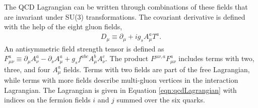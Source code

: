 The QCD Lagrangian can be written through combinations of these fields that are invariant under SU(3) transformations.
The covariant derivative is defined with the help of the eight gluon fields,
\begin{equation}\begin{split}
    D_\mu\equiv\partial_\mu+ig_sA_\mu^aT^a.
\end{split}\end{equation}
An antisymmetric field strength tensor is defined as $F^a_{\mu\nu}\equiv\partial_\mu A^a_\nu-\partial_\nu A^a_\mu+g_sf^{abc}A_\mu^bA_\nu^c$.
The product $F^{\mu\nu,a}F^a_{\mu\nu}$ includes terms with two, three, and four $A_\mu^a$ fields.
Terms with two fields are part of the free Lagrangian, while terms with more fields describe multi-gluon vertices in the interaction Lagrangian.
The Lagrangian is given in Equation \ref{eqn:qcdLagrangian} with indices on the fermion fields $i$ and $j$ summed over the six quarks.

